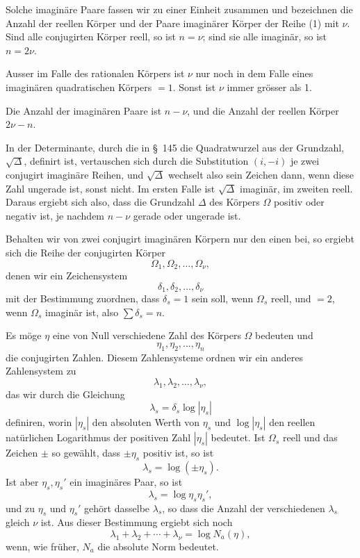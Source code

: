 \documentclass[11pt]{article}
\begin{document}
Solche imaginäre Paare fassen wir zu einer Einheit zusammen und bezeichnen die Anzahl der reellen Körper und der Paare imaginärer Körper der Reihe (1) mit $\nu$. Sind alle conjugirten Körper reell, so ist $n=\nu$; sind sie alle imaginär, so ist $n=2\nu$.

Ausser im Falle des rationalen Körpers ist $\nu$ nur noch in dem Falle eines imaginären quadratischen Körpers $=1$. Sonst ist $\nu$ immer grösser als 1.

Die Anzahl der imaginären Paare ist $n-\nu$, und die Anzahl der reellen Körper $2\nu-n$.

In der Determinante, durch die in \S~145 die Quadratwurzel aus der Grundzahl, $\sqrt{\Delta}$, definirt ist, vertauschen sich durch die Substitution $(i,-i)$ je zwei conjugirt imaginäre Reihen, und $\sqrt{\Delta}$ wechselt also sein Zeichen dann, wenn diese Zahl ungerade ist, sonst nicht. Im ersten Falle ist $\sqrt{\Delta}$ imaginär, im zweiten reell. Daraus ergiebt sich also, dass die Grundzahl $\Delta$ des Körpers $\Omega$ positiv oder negativ ist, je nachdem $n-\nu$ gerade oder ungerade ist.

Behalten wir von zwei conjugirt imaginären Körpern nur den einen bei, so ergiebt sich die Reihe der conjugirten Körper
\[
\Omega_1,\Omega_2,\ldots,\Omega_\nu,
\]
denen wir ein Zeichensystem
\[
\delta_1,\delta_2,\ldots,\delta_\nu
\]
mit der Bestimmung zuordnen, dass $\delta_s=1$ sein soll, wenn $\Omega_s$ reell, und $=2$, wenn $\Omega_s$ imaginär ist, also $\sum \delta_s=n$.

Es möge $\eta$ eine von Null verschiedene Zahl des Körpers $\Omega$ bedeuten und
\[
\eta_1,\eta_2,\ldots,\eta_n
\]
die conjugirten Zahlen. Diesem Zahlensysteme ordnen wir ein anderes Zahlensystem zu
\[
\lambda_1,\lambda_2,\ldots,\lambda_\nu,
\]
das wir durch die Gleichung
\begin{equation}
\lambda_s=\delta_s\log |\eta_s|
\tag{2}
\end{equation}
definiren, worin $|\eta_s|$ den absoluten Werth von $\eta_s$ und $\log|\eta_s|$ den reellen natürlichen Logarithmus der positiven Zahl $|\eta_s|$ bedeutet. Ist $\Omega_s$ reell und das Zeichen $\pm$ so gewählt, dass $\pm\eta_s$ positiv ist, so ist
\[
\lambda_s=\log(\pm\eta_s).
\]
Ist aber $\eta_s,\eta_s'$ ein imaginäres Paar, so ist
\[
\lambda_s=\log\eta_s\eta_s',
\]
und zu $\eta_s$ und $\eta_s'$ gehört dasselbe $\lambda_s$, so dass die Anzahl der verschiedenen $\lambda_s$ gleich $\nu$ ist. Aus dieser Bestimmung ergiebt sich noch
\begin{equation}
\lambda_1+\lambda_2+\cdots+\lambda_\nu=\log N_a(\eta),
\tag{3}
\end{equation}
wenn, wie früher, $N_a$ die absolute Norm bedeutet.
\end{document}
